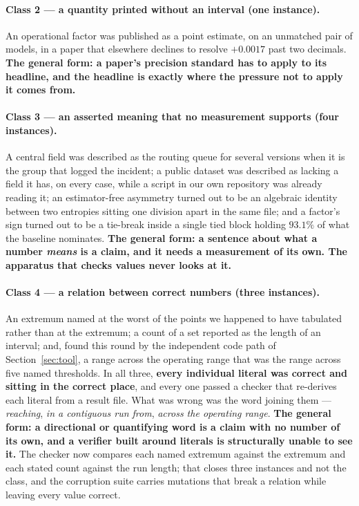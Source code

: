 \documentclass[preprint,12pt]{elsarticle}
\begin{document}
\paragraph{Class 2 --- a quantity printed without an interval (one
instance).} An operational factor was published as a point estimate, on an
unmatched pair of models, in a paper that elsewhere declines to resolve
$+0.0017$ past two decimals. \textbf{The general form: a paper's precision
standard has to apply to its headline, and the headline is exactly where the
pressure not to apply it comes from.}

\paragraph{Class 3 --- an asserted meaning that no measurement supports (four
instances).} A central field was described as the routing queue for several
versions when it is the group that logged the incident; a public dataset was
described as lacking a field it has, on every case, while a script in our own
repository was already reading it; an estimator-free asymmetry turned out to
be an algebraic identity between two entropies sitting one division apart in
the same file; and a factor's sign turned out to be a tie-break inside a
single tied block holding $93.1\%$ of what the baseline nominates.
\textbf{The general form: a sentence about what a number \emph{means} is a
claim, and it needs a measurement of its own. The apparatus that checks values
never looks at it.}

\paragraph{Class 4 --- a relation between correct numbers (three
instances).} An extremum named at the worst of the points we happened to have
tabulated rather than at the extremum; a count of a set reported as the length
of an interval; and, found this round by the independent code path of
Section~\ref{sec:tool}, a range across the operating range that was the range
across five named thresholds. In all three, \textbf{every individual literal
was correct and sitting in the correct place}, and every one passed a checker
that re-derives each literal from a result file. What was wrong was the word
joining them --- \emph{reaching}, \emph{in a contiguous run from},
\emph{across the operating range}. \textbf{The general form: a directional or
quantifying word is a claim with no number of its own, and a verifier built
around literals is structurally unable to see it.} The checker now compares
each named extremum against the extremum and each stated count against the run
length; that closes three instances and not the class, and the corruption
suite carries mutations that break a relation while leaving every value
correct.
\end{document}
